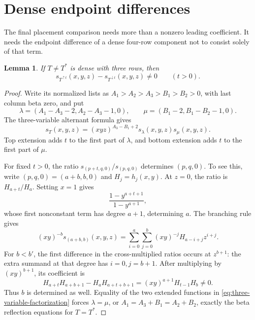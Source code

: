 \documentclass[11pt,a4paper]{amsart}
\numberwithin{equation}{section}
\theoremstyle{plain}
\newtheorem{lemma}[theorem]{Lemma}
\theoremstyle{definition}
\begin{document}
\section{Dense endpoint differences}\label{sec:dense-endpoints}

The final placement comparison needs more than a nonzero leading coefficient.  It needs the endpoint difference of a dense four-row component not to consist solely of that term.

\begin{lemma}\label{lem:three-variable-endpoint}
If \(T\ne T^*\) is dense with three rows, then
\[
 s_{T^{\uparrow t}}(x,y,z)-s_{T^{\downarrow t}}(x,y,z)\ne0
 \qquad(t>0).
\]
\end{lemma}

\begin{proof}
Write its normalized lists as
\(A_1>A_2>A_3>B_1>B_2>0\), with last column beta zero, and put
\[
 \lambda=(A_1-A_3-2,A_2-A_3-1,0),\qquad
 \mu=(B_1-2,B_1-B_2-1,0).
\]
The three-variable alternant formula gives
\begin{equation}\label{eq:three-variable-factorization}
 s_T(x,y,z)=(xyz)^{A_3-B_1+2}s_\lambda(x,y,z)s_\mu(x,y,z).
\end{equation}
Top extension adds \(t\) to the first part of \(\lambda\), and bottom extension adds \(t\) to the first part of \(\mu\).

For fixed \(t>0\), the ratio
\(s_{(p+t,q,0)}/s_{(p,q,0)}\) determines \((p,q,0)\).  To see this, write \((p,q,0)=(a+b,b,0)\) and \(H_j=h_j(x,y)\).  At \(z=0\), the ratio is \(H_{a+t}/H_a\).  Setting \(x=1\) gives
\[
 \frac{1-y^{a+t+1}}{1-y^{a+1}},
\]
whose first nonconstant term has degree \(a+1\), determining \(a\).  The branching rule gives
\begin{equation}\label{eq:branching-ratio}
 (xy)^{-b}s_{(a+b,b)}(x,y,z)
 =\sum_{i=0}^{a}\sum_{j=0}^{b}(xy)^{-j}H_{a-i+j}z^{i+j}.
\end{equation}
For \(b<b'\), the first difference in the cross-multiplied ratios occurs at \(z^{b+1}\): the extra summand at that degree has \(i=0,j=b+1\).  After multiplying by \((xy)^{b+1}\), its coefficient is
\[
 H_{a+t}H_{a+b+1}-H_aH_{a+t+b+1}
 =(xy)^{a+1}H_{t-1}H_b\ne0.
\]
Thus \(b\) is determined as well.  Equality of the two extended functions in \eqref{eq:three-variable-factorization} forces \(\lambda=\mu\), or \(A_1=A_3+B_1=A_2+B_2\), exactly the beta reflection equations for \(T=T^*\).
\end{proof}
\end{document}
